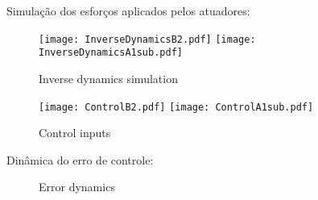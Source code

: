 \begin{itemize}
\begin{itemize}
Simula\c{c}\~ao dos esfor\c{c}os aplicados pelos atuadores:

\begin{figure}[H]
\centering
\begin{minipage}[b]{0.45\linewidth}
\texttt{[image: InverseDynamicsB2.pdf]}
\texttt{[image: InverseDynamicsA1sub.pdf]}
\label{fig:InverseDynamicsB2}
\caption{Inverse dynamics simulation}
\end{minipage}
\quad
\begin{minipage}[b]{0.45\linewidth}
\texttt{[image: ControlB2.pdf]}
\texttt{[image: ControlA1sub.pdf]}
\label{fig:ControlB2}
\caption{Control inputs}
\end{minipage}
\end{figure}

Din\^amica do erro de controle:

\begin{figure}[H]
\centering
{}
\quad
{}
%
\caption{Error dynamics}
\label{fig:figure}
\end{figure}


\end{itemize}


\end{itemize}




